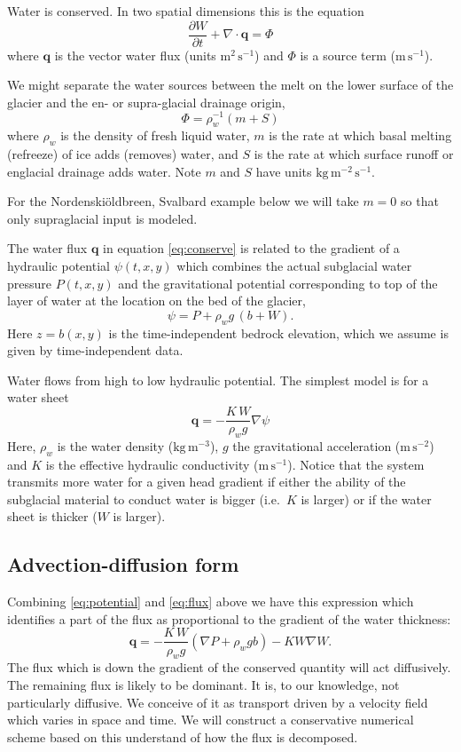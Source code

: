 \documentclass[12pt,final]{amsart}%
\newcommand\bq{\mathbf{q}}
\newcommand{\Div}{\nabla\cdot}
\newcommand{\grad}{\nabla}
\begin{document}
Water is conserved.  In two spatial dimensions this is the equation \citep{Clarke05}
\begin{equation} \label{eq:conserve}
\frac{\partial W}{\partial t} + \Div \bq = \Phi
\end{equation}
where $\bq$ is the vector water flux (units $\text{m}^2\,\text{s}^{-1}$) and $\Phi$ is a source term ($\text{m}\,\text{s}^{-1}$).

We might separate the water sources between the melt on the lower surface of the glacier and the en- or supra-glacial drainage origin,
  $$\Phi = \rho_w^{-1} \left(m + S\right)$$
where $\rho_w$ is the density of fresh liquid water, $m$ is the rate at which basal melting (refreeze) of ice adds (removes) water, and $S$ is the rate at which surface runoff or englacial drainage adds water.  Note $m$ and $S$ have units $\text{kg}\,\text{m}^{-2}\,\text{s}^{-1}$.

\newcommand{\Nbreen}{Nordenski\"oldbreen\xspace}
For the \Nbreen, Svalbard example below we will take $m=0$ so that only supraglacial input is modeled.

The water flux $\bq$ in equation \eqref{eq:conserve} is related to the gradient of a hydraulic potential $\psi(t,x,y)$ which combines the actual subglacial water pressure $P(t,x,y)$ and the gravitational potential corresponding to top of the layer of water at the location on the bed of the glacier,
\begin{equation} \label{eq:potential}
\psi = P + \rho_w g\, (b+W).
\end{equation}
Here $z=b(x,y)$ is the time-independent bedrock elevation, which we assume is given by time-independent data.

Water flows from high to low hydraulic potential.  The simplest model is for a water sheet \citep{Clarke05}
\begin{equation}  \label{eq:flux}
\bq = - \frac{K \, W}{\rho_w g} \grad \psi
\end{equation}
Here, $\rho_w$ is the water density ($\text{kg}\,\text{m}^{-3}$), $g$ the gravitational acceleration ($\text{m}\,\text{s}^{-2}$) and $K$ is the effective hydraulic conductivity ($\text{m}\,\text{s}^{-1}$).  Notice that the system transmits more water for a given head gradient if either the ability of the subglacial material to conduct water is bigger (i.e.~$K$ is larger) or if the water sheet is thicker ($W$ is larger).

\subsection*{Advection-diffusion form}  Combining \eqref{eq:potential} and \eqref{eq:flux} above we have this expression which identifies a part of the flux as proportional to the gradient of the water thickness:
	$$\bq = - \frac{K\, W}{\rho_w g} \left(\grad P + \rho_w g b\right) - K W \grad W.$$
The flux which is down the gradient of the conserved quantity will act diffusively.  The remaining flux is likely to be dominant.  It is, to our knowledge, not particularly diffusive.  We conceive of it as transport driven by a velocity field which varies in space and time.  We will construct a conservative numerical scheme based on this understand of how the flux is decomposed.
\end{document}

